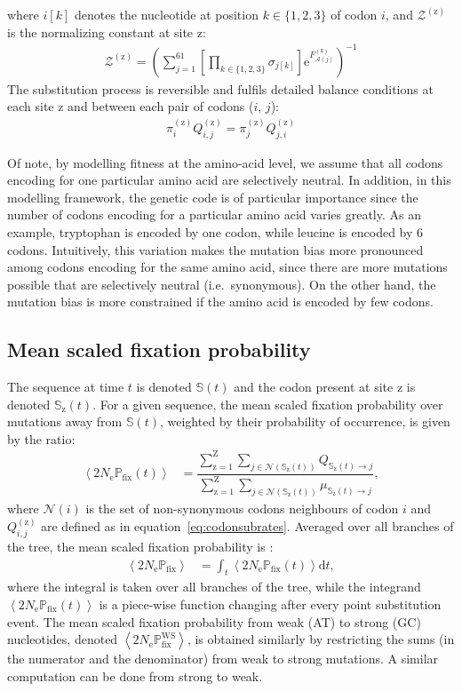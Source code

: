 \documentclass{article}
\newcommand{\der}{\mathrm{d}}
\newcommand{\e}{\text{e}}
\newcommand{\Ne}{N_{\text{e}}}
\newcommand{\proba}{\mathbb{P}}
\newcommand{\Pfix}{2 \Ne \proba_{\text{fix}}}
\newcommand{\mutequi}{\sigma}
\newcommand{\ci}{{i}}
\newcommand{\cj}{{j}}
\newcommand{\itoj}{\ci, \cj}
\newcommand{\submatrix}{Q}
\newcommand{\subequi}{\pi}
\newcommand{\aaMap}{\mathcal{A}}
\newcommand{\aaj}{\aaMap(\cj)}
\newcommand{\avgpfix}{\left\langle \Pfix \right\rangle }
\newcommand{\avgpfixATtoGC}{\left\langle \Pfix^{\text{WS}} \right\rangle }
\newcommand{\avgpfixtime}{\left\langle \Pfix (t) \right\rangle }
\newcommand{\scaledfit}{F}
\newcommand{\Fitj}{\scaledfit_{\aaj}}
\newcommand{\site}{\text{z}}
\newcommand{\Nsite}{\text{Z}}
\newcommand{\siteexp}{^{(\site)}}
\newcommand{\sumSetsite}{_{\site=1}^{\Nsite} }
\newcommand{\Seqi}{\mathbb{S}}
\newcommand{\NonSynNeighbors}{\mathcal{N}}
\newcommand{\setNonSynNeighbors}{\NonSynNeighbors\left(\ci\right)}
\begin{document}
where $\ci[k]$ denotes the nucleotide at position $k \in \{ 1, 2, 3 \}$ of codon $\ci$, and $\mathcal{Z}\siteexp $ is the normalizing constant at site $\site$:
\begin{align}
 \mathcal{Z}\siteexp = \left( \sum\limits_{\cj=1}^{61} \left[\prod\limits_{k \in \{ 1, 2, 3 \}} \mutequi_{\cj[k]}\right] \e^{\Fitj\siteexp} \right)^{-1}
\end{align}
The {substitution} process is reversible and fulfils detailed balance conditions at each site $\site$ and between each pair of codons ($\ci$, $\cj$):
\begin{align}
 \subequi_{\ci}\siteexp \submatrix_{\itoj}\siteexp = \subequi_{\cj}\siteexp \submatrix_{\cj, \ci}\siteexp
 \label{codonSubBalance}
\end{align}

Of note, by modelling fitness at the amino-acid level, we assume that all codons encoding for one particular amino acid are selectively {neutral}.
In addition, in this modelling framework, the genetic code is of particular importance since the number of codons encoding for a particular amino acid varies greatly.
As an example, tryptophan is encoded by one codon, while leucine is encoded by 6 codons.
Intuitively, this variation makes the mutation bias more pronounced among codons encoding for the same amino acid, since there are more mutations possible that are selectively {neutral} (i.e.~synonymous).
On the other hand, the mutation bias is more constrained if the amino acid is encoded by few codons.

\subsection{Mean scaled fixation probability}
\label{subsec:fixation-bias}
The sequence at time $t$ is denoted $\Seqi(t)$ and the codon present at site $\site$ is denoted $\Seqi_{\site}(t)$.
For a given sequence, the mean scaled fixation probability over mutations away from $\Seqi(t)$, weighted by their probability of occurrence, is given by the ratio:
\begin{align}
 \avgpfixtime & = \dfrac{ \sum\limits\sumSetsite \sum\limits_{\cj \in \NonSynNeighbors \left ( \Seqi_{\site}(t) \right)} Q_{\Seqi_{\site}(t) \to \cj}}{ \sum\limits\sumSetsite \sum\limits_{\cj \in \NonSynNeighbors \left ( \Seqi_{\site}(t) \right)} \mu_{\Seqi_{\site}(t) \to \cj}},
\end{align}
where $\setNonSynNeighbors$ is the set of {non-synonymous} codons neighbours of codon $\ci$ and $\submatrix_{\itoj}\siteexp$ are defined as in equation~\ref{eq:codonsubrates}.
Averaged over all branches of the tree, the mean scaled fixation probability is :
\begin{align}
 \avgpfix & = \int_{t} \avgpfixtime \der t,
\end{align}
where the integral is taken over all branches of the tree, while the integrand $\avgpfixtime$ is a piece-wise function changing after every point {substitution} event.
The mean scaled fixation probability from weak (AT) to strong (GC) nucleotides, denoted $\avgpfixATtoGC$, is obtained similarly by restricting the sums (in the numerator and the denominator) from weak to strong mutations.
A similar computation can be done from strong to weak.
\end{document}
